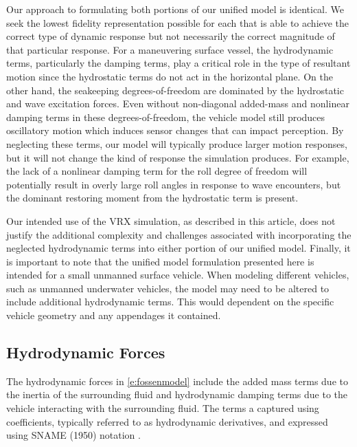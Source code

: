 \documentclass[utf8]{frontiersSCNS} %
\begin{document}
Our approach to formulating both portions of our unified model is identical. We seek the lowest fidelity representation possible for each that is able to achieve the correct type of dynamic response but not necessarily the correct magnitude of that particular response. For a maneuvering surface vessel, the hydrodynamic terms, particularly the damping terms, play a critical role in the type of resultant motion \color{red} since the hydrostatic terms do not act in the horizontal plane. On the other hand, the seakeeping degrees-of-freedom are dominated by the hydrostatic and wave excitation forces. Even without non-diagonal added-mass and nonlinear damping terms in these degrees-of-freedom, the vehicle model still produces oscillatory motion which induces sensor changes that can impact perception. By neglecting these terms, our model will typically produce larger motion responses, but it will not change the kind of response the simulation produces. For example, the lack of a nonlinear damping term for the roll degree of freedom will potentially result in overly large roll angles in response to wave encounters, but the dominant restoring moment from the hydrostatic term is present.\color{black}

Our intended use of the VRX simulation, as described in this article, does not justify the additional complexity and challenges associated with incorporating the neglected hydrodynamic terms into either portion of our unified model. Finally, it is important to note that the unified model formulation presented here is intended for a small unmanned surface vehicle. When modeling different vehicles, such as unmanned underwater vehicles, the model may need to be altered to include additional hydrodynamic terms. This would dependent on the specific vehicle geometry and any appendages it contained.%
%
\subsection{Hydrodynamic Forces}\label{s:hydro}
%
The hydrodynamic forces in \eqref{e:fossenmodel} include the added mass terms due to the inertia of the surrounding fluid and hydrodynamic damping terms due to the vehicle interacting with the surrounding fluid. The terms a captured using coefficients, typically referred to as hydrodynamic derivatives, and expressed using SNAME (1950) notation \citep{fossen11handbook}.
\end{document}
